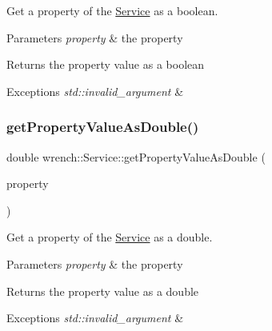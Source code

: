 Get a property of the \hyperlink{classwrench_1_1_service}{Service} as a boolean. 


\begin{DoxyParams}{Parameters}
{\em property} & the property \\
\hline
\end{DoxyParams}
\begin{DoxyReturn}{Returns}
the property value as a boolean
\end{DoxyReturn}

\begin{DoxyExceptions}{Exceptions}
{\em std\+::invalid\+\_\+argument} & \\
\hline
\end{DoxyExceptions}
\mbox{\label{classwrench_1_1_service_af7d4b5085ba46d9cead58f2d253e8339}} 
\subsubsection{\texorpdfstring{get\+Property\+Value\+As\+Double()}{getPropertyValueAsDouble()}}
{\footnotesize\ttfamily double wrench\+::\+Service\+::get\+Property\+Value\+As\+Double (\begin{DoxyParamCaption}\item[{std\+::string}]{property }\end{DoxyParamCaption})}



Get a property of the \hyperlink{classwrench_1_1_service}{Service} as a double. 


\begin{DoxyParams}{Parameters}
{\em property} & the property \\
\hline
\end{DoxyParams}
\begin{DoxyReturn}{Returns}
the property value as a double
\end{DoxyReturn}

\begin{DoxyExceptions}{Exceptions}
{\em std\+::invalid\+\_\+argument} & \\
\hline
\end{DoxyExceptions}
\mbox{\label{classwrench_1_1_service_af7da6bc9cb5d322bfdc6467941f2372f}} 

